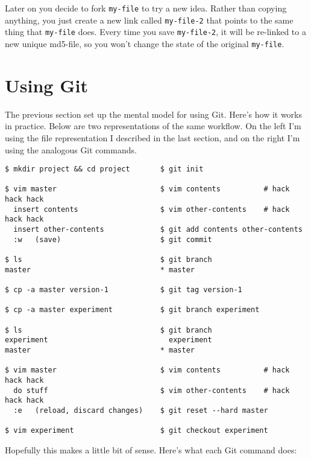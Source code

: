 \documentclass{article}
\begin{document}
  Later on you decide to fork {\tt my-file} to try a new idea. Rather than copying anything, you just create a new link called {\tt my-file-2} that points to the same thing that {\tt my-file}
  does. Every time you save {\tt my-file-2}, it will be re-linked to a new unique md5-file, so you won't change the state of the original {\tt my-file}.

\section{Using Git}
  The previous section set up the mental model for using Git. Here's how it works in practice. Below are two representations of the same workflow. On the left I'm using the file representation
  I described in the last section, and on the right I'm using the analogous Git commands.

\begin{verbatim}
$ mkdir project && cd project       $ git init

$ vim master                        $ vim contents          # hack hack hack
  insert contents                   $ vim other-contents    # hack hack hack
  insert other-contents             $ git add contents other-contents
  :w   (save)                       $ git commit

$ ls                                $ git branch
master                              * master

$ cp -a master version-1            $ git tag version-1

$ cp -a master experiment           $ git branch experiment

$ ls                                $ git branch
experiment                            experiment
master                              * master

$ vim master                        $ vim contents          # hack hack hack
  do stuff                          $ vim other-contents    # hack hack hack
  :e   (reload, discard changes)    $ git reset --hard master

$ vim experiment                    $ git checkout experiment
\end{verbatim}

  Hopefully this makes a little bit of sense. Here's what each Git command does:
\end{document}
